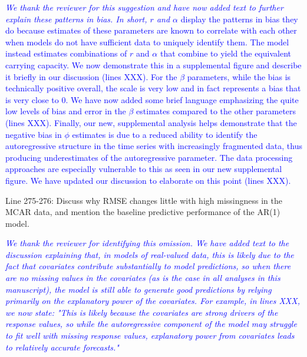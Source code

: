 \documentclass{article}
\begin{document}
\begin{linenumbers}
\noindent \textcolor{blue}{\textit{We thank the reviewer for this suggestion and have now added text to further explain these patterns in bias. In short, $r$ and $\alpha$} display the patterns in bias they do because estimates of these parameters are known to correlate with each other when models do not have sufficient data to uniquely identify them. The model instead estimates combinations of $r$ and $\alpha$ that combine to yield the equivalent carrying capacity. We now demonstrate this in a supplemental figure and describe it briefly in our discussion (lines XXX). For the $\beta$ parameters, while the bias is technically positive overall, the scale is very low and in fact represents a bias that is very close to 0. We have now added some brief language emphasizing the quite low levels of bias and error in the $\beta$ estimates compared to the other parameters (lines XXX). Finally, our new, supplemental analysis helps demonstrate that the negative bias in $\phi$ estimates is due to a reduced ability to identify the autoregressive structure in the time series with increasingly fragmented data, thus producing underestimates of the autoregressive parameter. The data processing approaches are especially vulnerable to this as seen in our new supplemental figure. We have updated our discussion to elaborate on this point (lines XXX).}

Line 275-276: Discuss why RMSE changes little with high missingness in the MCAR data, and mention the baseline predictive performance of the AR(1) model.

\noindent \textcolor{blue}{\textit{We thank the reviewer for identifying this omission. We have added text to the discussion explaining that, in models of real-valued data, this is likely due to the fact that covariates contribute substantially to model predictions, so when there are no missing values in the covariates (as is the case in all analyses in this manuscript), the model is still able to generate good predictions by relying primarily on the explanatory power of the covariates. For example, in lines XXX, we now state: "This is likely because the covariates are strong drivers of the response values, so while the autoregressive component of the model may struggle to fit well with missing response values, explanatory power from covariates leads to relatively accurate forecasts."}} 


\end{linenumbers}
\end{document}
